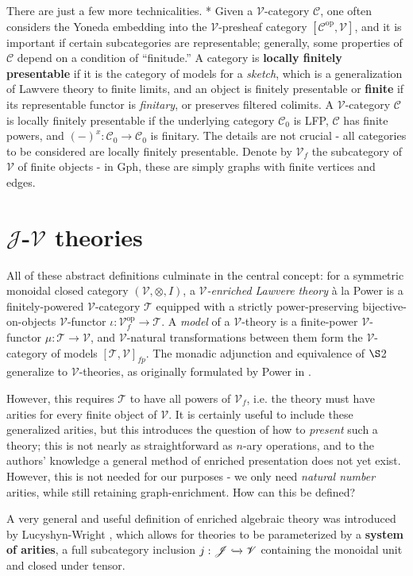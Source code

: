 \documentclass[a4paper,UKenglish]{article}
\theoremstyle{definition}
\newcommand{\Gph}{\mathrm{Gph}}
\newcommand{\op}{\mathrm{op}}
\newcommand{\V}{\mathscr{V}}
\newcommand{\C}{\mathscr{C}}
\newcommand{\T}{\mathscr{T}}
\newcommand{\J}{\mathscr{J}}
\begin{document}
There are just a few more technicalities. * Given a $\V$-category $\C$, one often considers the Yoneda embedding into the $\V$-presheaf category $[\C^\op, \V]$, and it is important if certain subcategories are representable; generally, some properties of $\C$ depend on a condition of ``finitude.'' \cite{finite} A category is \textbf{locally finitely presentable} if it is the category of models for a \textit{sketch}, which is a generalization of Lawvere theory to finite limits, and an object is finitely presentable or \textbf{finite} if its representable functor is \textit{finitary}, or preserves filtered colimits. A $\V$-category $\C$ is locally finitely presentable if the underlying category $\C_0$ is LFP, $\C$ has finite powers, and $(-)^x: \C_0 \to \C_0$ is finitary. The details are not crucial - all categories to be considered are locally finitely presentable. Denote by $\V_f$ the subcategory of $\V$ of finite objects - in $\Gph$, these are simply graphs with finite vertices and edges.\\

\section{$\J$-$\V$ theories}
All of these abstract definitions culminate in the central concept: for a symmetric monoidal closed category $(\V,\otimes,I)$, a \textit{$\V$-enriched Lawvere theory} \`a la Power \cite{power} is a finitely-powered $\V$-category $\T$ equipped with a strictly power-preserving bijective-on-objects $\V$-functor $\iota:\V_f^\op \to \T$. A \textit{model} of a $\V$-theory is a finite-power $\V$-functor $\mu:\T \to \V$, and $\V$-natural transformations between them form the $\V$-category of models $[\T,\V]_{fp}$. The monadic adjunction and equivalence of $\S$2 generalize to $\V$-theories, as originally formulated by Power in \cite{power}.

However, this requires $\T$ to have all powers of $\V_f$, i.e. the theory must have arities for every finite object of $\V$. It is certainly useful to include these generalized arities, but this introduces the question of how to \textit{present} such a theory; this is not nearly as straightforward as $n$-ary operations, and to the authors' knowledge a general method of enriched presentation does not yet exist. However, this is not needed for our purposes - we only need \textit{natural number} arities, while still retaining graph-enrichment. How can this be defined?

A very general and useful definition of enriched algebraic theory was introduced by Lucyshyn-Wright \cite{rbb}, which allows for theories to be parameterized by a \textbf{system of arities}, a full subcategory inclusion $j: \J \xhookrightarrow{} \V$ containing the monoidal unit and closed under tensor.
\end{document}
